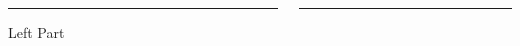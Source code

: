\documentclass{beamer}
\begin{document}
\begin{frame}
\begin{columns}[T] %
\begin{column}{.48\textwidth}
\color{red}\rule{\linewidth}{4pt}

Left Part
\end{column}%
\hfill%
\begin{column}{.48\textwidth}
\color{blue}\rule{\linewidth}{4pt}

\end{column}%
\end{columns}
\end{frame}
\end{document}
